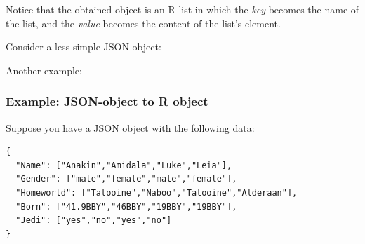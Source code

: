 \documentclass[
]{book}
\newenvironment{Shaded}{\begin{snugshade}}{\end{snugshade}}
\newcommand{\CommentTok}[1]{\textcolor[rgb]{0.56,0.35,0.01}{\textit{#1}}}
\newcommand{\FunctionTok}[1]{\textcolor[rgb]{0.00,0.00,0.00}{#1}}
\newcommand{\NormalTok}[1]{#1}
\newcommand{\OtherTok}[1]{\textcolor[rgb]{0.56,0.35,0.01}{#1}}
\newcommand{\StringTok}[1]{\textcolor[rgb]{0.31,0.60,0.02}{#1}}
\begin{document}
Notice that the obtained object is an R list in which the \emph{key} becomes the
name of the list, and the \emph{value} becomes the content of the list's element.

Consider a less simple JSON-object:

\begin{Shaded}
\end{Shaded}

Another example:

\begin{Shaded}
\end{Shaded}

\hypertarget{example-json-object-to-r-object-1}{%
\subsubsection*{Example: JSON-object to R object}\label{example-json-object-to-r-object-1}}

Suppose you have a JSON object with the following data:

\begin{verbatim}
{
  "Name": ["Anakin","Amidala","Luke","Leia"],
  "Gender": ["male","female","male","female"],
  "Homeworld": ["Tatooine","Naboo","Tatooine","Alderaan"],
  "Born": ["41.9BBY","46BBY","19BBY","19BBY"],
  "Jedi": ["yes","no","yes","no"]
}
\end{verbatim}
\end{document}
